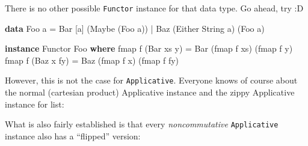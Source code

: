 \documentclass[]{article}
\newenvironment{Shaded}{}{}
\newcommand{\DataTypeTok}[1]{\textcolor[rgb]{0.56,0.13,0.00}{#1}}
\newcommand{\FunctionTok}[1]{\textcolor[rgb]{0.02,0.16,0.49}{#1}}
\newcommand{\KeywordTok}[1]{\textcolor[rgb]{0.00,0.44,0.13}{\textbf{#1}}}
\newcommand{\NormalTok}[1]{#1}
\newcommand{\OperatorTok}[1]{\textcolor[rgb]{0.40,0.40,0.40}{#1}}
\newcommand{\OtherTok}[1]{\textcolor[rgb]{0.00,0.44,0.13}{#1}}
\begin{document}
There is no other possible \texttt{Functor} instance for that data type. Go
ahead, try :D

\begin{Shaded}
\begin{Highlighting}[]
\KeywordTok{data} \DataTypeTok{Foo}\NormalTok{ a }\OtherTok{=} \DataTypeTok{Bar}\NormalTok{ [a] (}\DataTypeTok{Maybe}\NormalTok{ (}\DataTypeTok{Foo}\NormalTok{ a)) }\OperatorTok{|} \DataTypeTok{Baz}\NormalTok{ (}\DataTypeTok{Either} \DataTypeTok{String}\NormalTok{ a) (}\DataTypeTok{Foo}\NormalTok{ a)}

\KeywordTok{instance} \DataTypeTok{Functor} \DataTypeTok{Foo} \KeywordTok{where}
    \FunctionTok{fmap}\NormalTok{ f (}\DataTypeTok{Bar}\NormalTok{ xs y) }\OtherTok{=} \DataTypeTok{Bar}\NormalTok{ (}\FunctionTok{fmap}\NormalTok{ f xs) (}\FunctionTok{fmap}\NormalTok{ f y)}
    \FunctionTok{fmap}\NormalTok{ f (}\DataTypeTok{Baz}\NormalTok{ x fy) }\OtherTok{=} \DataTypeTok{Baz}\NormalTok{ (}\FunctionTok{fmap}\NormalTok{ f x) (}\FunctionTok{fmap}\NormalTok{ f fy)}
\end{Highlighting}
\end{Shaded}

However, this is not the case for \texttt{Applicative}. Everyone knows of course
about the normal (cartesian product) Applicative instance and the zippy
Applicative instance for list:

\begin{Shaded}
\end{Shaded}

What is also fairly established is that every \emph{noncommutative}
\texttt{Applicative} instance also has a ``flipped'' version:
\end{document}

